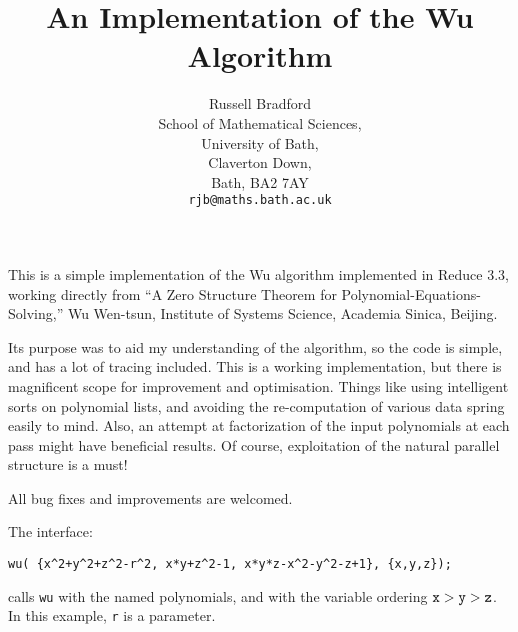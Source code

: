 
\pagestyle{empty}
\setlength{\parindent}{0in}
\setlength{\parskip}{0.1in}


\title{An Implementation of the Wu Algorithm}
\author{Russell Bradford \\
School of Mathematical Sciences,\\
University of Bath,\\
Claverton Down,\\
Bath, BA2 7AY \\
\tt rjb@maths.bath.ac.uk}
\date{}
\maketitle\thispagestyle{empty}

This is a simple implementation of the Wu algorithm implemented in Reduce
3.3, working directly from
``A Zero Structure Theorem for Polynomial-Equations-Solving,''
Wu Wen-tsun, Institute of Systems Science, Academia Sinica, Beijing.

Its purpose was to aid my understanding of the algorithm, so the code is
simple, and has a lot of tracing included. This is a working implementation,
but there is magnificent scope for improvement and optimisation. Things
like using intelligent sorts on polynomial lists, and avoiding the
re-computation of various data spring easily to mind. Also, an attempt
at factorization of the input polynomials at each pass might have beneficial
results. Of course, exploitation of the natural parallel structure is a must!

All bug fixes and improvements are welcomed.

The interface:
\begin{verbatim}
wu( {x^2+y^2+z^2-r^2, x*y+z^2-1, x*y*z-x^2-y^2-z+1}, {x,y,z});
\end{verbatim}
calls {\tt wu} with the named polynomials, and with the variable ordering
${\tt x} > {\tt y} > {\tt z}$. In this example, {\tt r} is a parameter.

